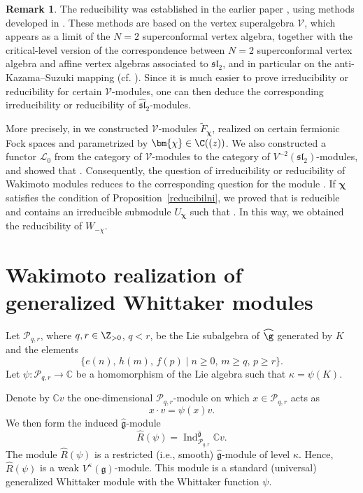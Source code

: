 \documentclass[pdftex]{sigma}
\numberwithin{equation}{section}
\theoremstyle{definition}
\newtheorem{Remark}[Theorem]{Remark}
\newcommand{\1}{\textbf{1}}
\begin{document}
\begin{Remark}
The reducibility was established in the earlier paper \cite{A-14}, using methods developed in \cite{A-07}. These methods are based on the vertex superalgebra $\mathcal V$, which appears as a limit of the $N=2$ superconformal vertex algebra, together with the critical-level version of the correspondence between $N=2$ superconformal vertex algebra and affine vertex algebras associated to $\mathfrak{sl}_2$, and in particular on the anti-Kazama--Suzuki mapping (cf. \cite{A-1999, FST}). Since it is much easier to prove irreducibility or reducibility for certain $\mathcal V$-modules, one can then deduce the corresponding irreducibility or reducibility of $\widehat{\mathfrak{sl}}_2$-modules.

More precisely, in \cite{A-07} we constructed $\mathcal V$-modules $\widetilde F_{\bm{\chi}}$, realized on certain fermionic Fock spaces and parametrized by $\bm{\chi} \in \C((z))$. We also constructed a functor $\mathcal L_0$ from the category of $\mathcal V$\nobreakdash-mod\-ules to the category of $V^{-2}(\mathfrak{sl}_2)$-modules, and showed that
.
Consequently, the question of irreducibility or reducibility of Wakimoto modules reduces to the corresponding question for the module . If $\bm{\chi}$ satisfies the condition of Proposition~\ref{reducibilni}, we proved that  is reducible and contains an irreducible submodule $U_{\bm{\chi}}$ such that
.
In this way, we obtained the reducibility of $W_{-\chi}$.
\end{Remark}

\section{Wakimoto realization of generalized Whittaker modules}
 \label{gen-whitt-sect}

Let $\mathcal P_{q, r}$, where $q, r \in {\Z}_{>0}$, $q < r$, be the Lie subalgebra of $\widehat{\g}$ generated by $K$ and the elements
\[
 \{ e(n),\, h(m),\, f(p) \mid n \ge 0 ,\, m \ge q, \, p \ge r \}.
\]
Let $\psi \colon \mathcal{P}_{q, r} \to \mathbb{C}$ be a homomorphism of the Lie algebra such that $\kappa = \psi(K)$.

Denote by $\mathbb{C}v$ the one-dimensional $\mathcal{P}_{q,r }$-module on which $x \in \mathcal{P}_{q, r}$ acts as
\begin{equation}\label{whit-gen}
x\cdot v=\psi(x) v.
\end{equation}
We then form the induced $\widehat{\mathfrak{g}}$-module
\[
 \widehat{R}(\psi) = \operatorname{Ind}_{\mathcal{P}_{q, r}}^{\widehat{\mathfrak{g}}} \mathbb{C}v.
\]
The module $\widehat{R}(\psi)$ is a restricted (i.e., smooth) $\widehat{\mathfrak{g}}$-module of level $\kappa$.
Hence, $\widehat{R}(\psi)$ is a weak $V^{\kappa}(\mathfrak{g})$-module. This module is a standard (universal) generalized Whittaker module with the Whittaker function $\psi$.
\end{document}
